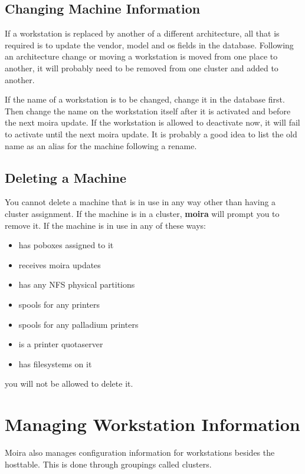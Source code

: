 \documentclass{book}
\begin{document}
\subsection{Changing Machine Information}
If a workstation is replaced by another of a different architecture,
all that is required is to update the vendor, model and os fields in
the database.  Following an architecture change or moving a
workstation is moved from one place to another, it will probably need
to be removed from one cluster and added to another.

\label{hostrename}
If the name of a workstation is to be changed, change it in the
database first.  Then change the name on the workstation itself after
it is activated and before the next moira update.  If the workstation
is allowed to deactivate now, it will fail to activate until the next
moira update.  It is probably a good idea to list the old name as an
alias for the machine following a rename.

\subsection{Deleting a Machine}
You cannot delete a machine that is in use in any way other than
having a cluster assignment.  If the machine is in a cluster,
{\bf moira} will prompt you to remove it.  If the machine is in use in
any of these ways:
\begin{itemize}
\item has poboxes assigned to it
\item receives moira updates
\item has any NFS physical partitions
\item spools for any printers
\item spools for any palladium printers
\item is a printer quotaserver
\item has filesystems on it
\end{itemize}
you will not be allowed to delete it.


\section{Managing Workstation Information}

Moira also manages configuration information for workstations besides
the hosttable.  This is done through groupings called clusters.
\end{document}
